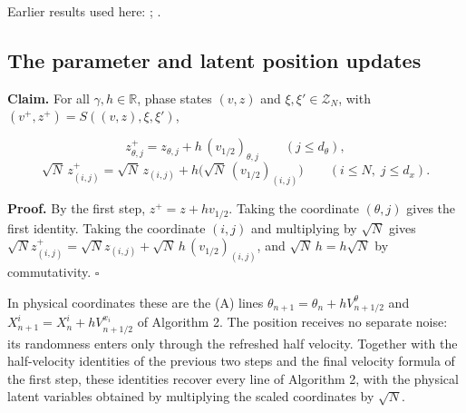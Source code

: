 \documentclass[11pt,a4paper]{report}
\begin{document}
Earlier results used here: \cite[Section~3.1.1]{LangevinLean2026IPLA}; \cite[Section~3.20.5]{LangevinLean2026Kinetic}.
\subsection{\texorpdfstring{The parameter and latent position updates}{The parameter and latent position updates}}
\label{report-step-KIPLMC-Splitting-lean-4}


\textbf{Claim.} For all \(\gamma,h\in\mathbb R\), phase states \((v,z)\) and \(\xi,\xi'\in\mathcal Z_N\), with \((v^+,z^+)=S((v,z),\xi,\xi')\),


\[z^+_{\theta,j}=z_{\theta,j}+h\,(v_{1/2})_{\theta,j}\qquad(j\le d_\theta),\]
\[\sqrt N\,z^+_{(i,j)}=\sqrt N\,z_{(i,j)}+h\bigl(\sqrt N\,(v_{1/2})_{(i,j)}\bigr)\qquad(i\le N,\;j\le d_x).\]


\textbf{Proof.} By the first step, \(z^+=z+hv_{1/2}\). Taking the coordinate \((\theta,j)\) gives the first identity. Taking the coordinate \((i,j)\) and multiplying by \(\sqrt N\) gives \(\sqrt N z^+_{(i,j)}=\sqrt N z_{(i,j)}+\sqrt N\,h\,(v_{1/2})_{(i,j)}\), and \(\sqrt N\,h=h\sqrt N\) by commutativity. \(\square\)




In physical coordinates these are the (A) lines \(\theta_{n+1}=\theta_n+hV^\theta_{n+1/2}\) and \(X^i_{n+1}=X^i_n+hV^{x_i}_{n+1/2}\) of Algorithm 2. The position receives no separate noise: its randomness enters only through the refreshed half velocity. Together with the half-velocity identities of the previous two steps and the final velocity formula of the first step, these identities recover every line of Algorithm 2, with the physical latent variables obtained by multiplying the scaled coordinates by \(\sqrt N\).
\end{document}

